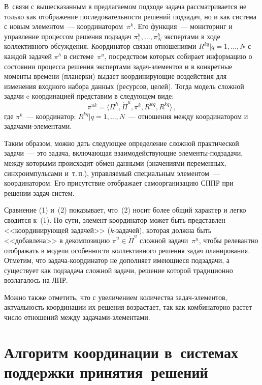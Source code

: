 \begin{multicols}{2}
  В~связи с вышесказанным в предлагаемом подходе задача рассматривается 
не только как отображение последовательности решений подзадач, но и как 
система с новым элементом~--- координатором~$\pi^k$. Его 
функция~--- мониторинг и управление процессом решения подзадач 
$\pi_1^h,\ldots , \pi_N^h$ экспертами в ходе коллективного обсуждения. 
Координатор связан отношениями $R^{kq}\vert q=1,\ldots ,N$ с каж\-дой задачей 
$\pi^h$ в системе~$\pi^u$, посредством которых собирает информацию о 
состоянии процесса решения экспертами за\-дач-эле\-мен\-тов и в конкретные 
моменты времени (планерки) выдает координирующие воздействия для 
изменения входного набора данных (ресурсов, целей). Тогда модель сложной 
задачи c координацией представим в следующем виде:
  \begin{equation}
  \pi^{uk} =\langle \Pi^h, \dot{\Pi}^u, \pi^k, R^{wq}, R^{kq}\rangle\,,
  \label{e2kol}
  \end{equation}
где $\pi^k$~--- координатор; $R^{kq}\vert q=1, \ldots , N$~--- отношения между 
координатором и за\-да\-ча\-ми-эле\-мен\-тами.
  
  Таким образом, можно дать следующее определение сложной практической 
задачи~--- это задача, включающая взаимодействующие 
  эле\-мен\-ты-под\-за\-да\-чи, между которыми происходит обмен данными 
(значениями переменных, синхроимпульсами и~т.\,п.), управляемый 
специальным элементом~--- координатором. Его присутствие отображает 
самоорганизацию СППР при решении за\-дач-сис\-тем.
  
  Сравнение (1) и~(2) показывает, что~(2) носит более общий характер и легко 
сводится к~(1). По сути, элемент-координатор может быть представлен 
<<координирующей задачей>> ($k$-за\-да\-чей), которая должна быть 
<<добавлена>> в декомпозицию $\dot{\pi}^u\in \dot{\Pi}^u$ сложной 
задачи~$\pi^u$, чтобы релевантно отображать в модели особенности 
коллективного решения задач планирования. Отметим, что 
  за\-да\-ча-ко\-ор\-ди\-на\-тор не дополняет имеющиеся подзадачи, а 
существует как подзадача сложной задачи, решение которой традиционно 
возлагалось на ЛПР.
  
  Можно также отметить, что с увеличением количества за\-дач-эле\-мен\-тов, 
актуальность координации их решения возрастает, так как комбинаторно растет 
число отношений между за\-да\-ча\-ми-эле\-мен\-тами.
  
\section{Алгоритм координации в~системах поддержки принятия~решений}
  

\end{multicols}

